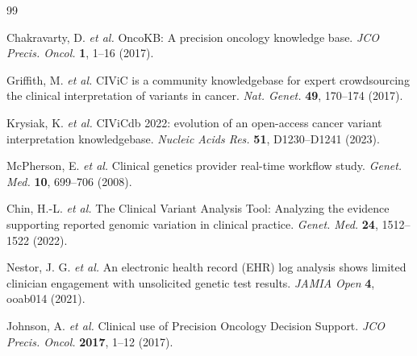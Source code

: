 % 
%
%

\begin{thebibliography}{99}

Chakravarty, D. \textit{et al.} OncoKB: A precision oncology knowledge base. \textit{JCO Precis. Oncol.} \textbf{1}, 1--16 (2017).

Griffith, M. \textit{et al.} CIViC is a community knowledgebase for expert crowdsourcing the clinical interpretation of variants in cancer. \textit{Nat. Genet.} \textbf{49}, 170--174 (2017).

Krysiak, K. \textit{et al.} CIViCdb 2022: evolution of an open-access cancer variant interpretation knowledgebase. \textit{Nucleic Acids Res.} \textbf{51}, D1230--D1241 (2023).

McPherson, E. \textit{et al.} Clinical genetics provider real-time workflow study. \textit{Genet. Med.} \textbf{10}, 699--706 (2008).

Chin, H.-L. \textit{et al.} The Clinical Variant Analysis Tool: Analyzing the evidence supporting reported genomic variation in clinical practice. \textit{Genet. Med.} \textbf{24}, 1512--1522 (2022).

Nestor, J. G. \textit{et al.} An electronic health record (EHR) log analysis shows limited clinician engagement with unsolicited genetic test results. \textit{JAMIA Open} \textbf{4}, ooab014 (2021).

Johnson, A. \textit{et al.} Clinical use of Precision Oncology Decision Support. \textit{JCO Precis. Oncol.} \textbf{2017}, 1--12 (2017).


\end{thebibliography}
